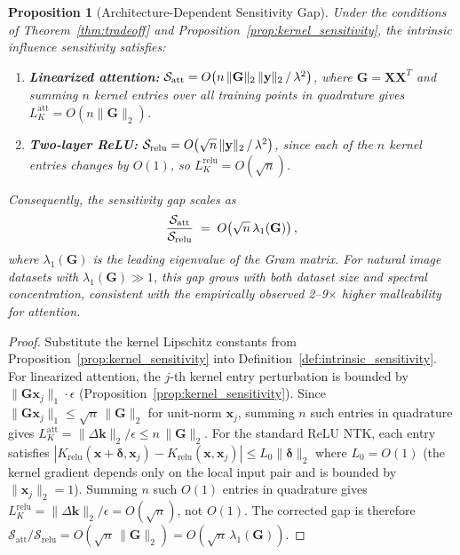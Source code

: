 \documentclass{article}
\theoremstyle{plain}
\newtheorem{proposition}[theorem]{Proposition}
\theoremstyle{definition}
\theoremstyle{remark}
\begin{document}
\begin{proposition}[Architecture-Dependent Sensitivity Gap]
\label{prop:sensitivity_gap}
Under the conditions of Theorem~\ref{thm:tradeoff} and Proposition~\ref{prop:kernel_sensitivity}, the intrinsic influence sensitivity satisfies:
\begin{enumerate}
    \item \textbf{Linearized attention:} $\mathcal{S}_{\textup{att}} = O\!\left(n\,\|\mathbf{G}\|_2\,\|\mathbf{y}\|_2\,/\,\lambda^2\right)$, where $\mathbf{G} = \mathbf{X}\mathbf{X}^T$ and summing $n$ kernel entries over all training points in quadrature gives $L_K^{\mathrm{att}} = O(n\|\mathbf{G}\|_2)$.
    \item \textbf{Two-layer ReLU:} $\mathcal{S}_{\textup{relu}} = O\!\left(\sqrt{n}\,\|\mathbf{y}\|_2\,/\,\lambda^2\right)$, since each of the $n$ kernel entries changes by $O(1)$, so $L_K^{\mathrm{relu}} = O(\sqrt{n})$.
\end{enumerate}
Consequently, the sensitivity gap scales as
$$\frac{\mathcal{S}_{\textup{att}}}{\mathcal{S}_{\textup{relu}}} \;=\; O\!\left(\sqrt{n}\,\lambda_1(\mathbf{G})\right),$$
where $\lambda_1(\mathbf{G})$ is the leading eigenvalue of the Gram matrix. For natural image datasets with $\lambda_1(\mathbf{G}) \gg 1$, this gap grows with both dataset size and spectral concentration, consistent with the empirically observed 2--9$\times$ higher malleability for attention.
\end{proposition}

\begin{proof}
Substitute the kernel Lipschitz constants from Proposition~\ref{prop:kernel_sensitivity} into Definition~\ref{def:intrinsic_sensitivity}. For linearized attention, the $j$-th kernel entry perturbation is bounded by $\|\mathbf{G}\mathbf{x}_j\|_1 \cdot \epsilon$ (Proposition~\ref{prop:kernel_sensitivity}). Since $\|\mathbf{G}\mathbf{x}_j\|_1 \leq \sqrt{n}\,\|\mathbf{G}\|_2$ for unit-norm $\mathbf{x}_j$, summing $n$ such entries in quadrature gives $L_K^{\mathrm{att}} = \|\Delta\mathbf{k}\|_2/\epsilon \leq n\,\|\mathbf{G}\|_2$. For the standard ReLU NTK, each entry satisfies $|K_{\mathrm{relu}}(\mathbf{x}+\boldsymbol{\delta}, \mathbf{x}_j) - K_{\mathrm{relu}}(\mathbf{x}, \mathbf{x}_j)| \leq L_0 \|\boldsymbol{\delta}\|_2$ where $L_0 = O(1)$ (the kernel gradient depends only on the local input pair and is bounded by $\|\mathbf{x}_j\|_2 = 1$). Summing $n$ such $O(1)$ entries in quadrature gives $L_K^{\mathrm{relu}} = \|\Delta\mathbf{k}\|_2/\epsilon = O(\sqrt{n})$, not $O(1)$. The corrected gap is therefore $\mathcal{S}_{\mathrm{att}}/\mathcal{S}_{\mathrm{relu}} = O(\sqrt{n}\,\|\mathbf{G}\|_2) = O(\sqrt{n}\,\lambda_1(\mathbf{G}))$.
\end{proof}
\end{document}
